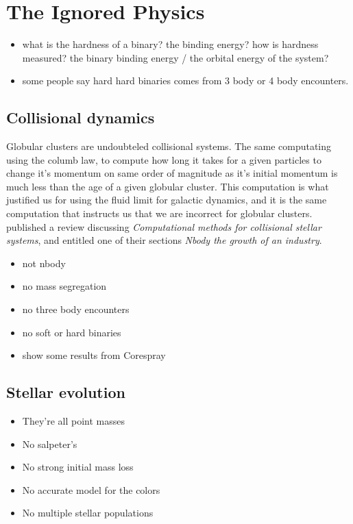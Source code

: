 \section{The Ignored Physics}



    \begin{itemize}
        \item what is the hardness of a binary? the binding energy? how is hardness measured? the binary binding energy / the orbital energy of the system? 
        \item some people say hard hard binaries comes from 3 body or 4 body encounters. 
    \end{itemize}


    \subsection{Collisional dynamics}

        Globular clusters are undoubteled collisional systems. The same computating using the columb law, to compute how long it takes for a given particles to change it's momentum on same order of magnitude as it's initial momentum is much less than the age of a given globular cluster. This computation is what justified us for using the fluid limit for galactic dynamics, and it is the same computation that instructs us that we are incorrect for globular clusters. \citet{2023LRCA....9....3S} published a review discussing \textit{Computational methods for collisional stellar systems}, and entitled one of their sections \textit{Nbody the growth of an industry}. 


        \begin{itemize}
            \item not nbody
            \item no mass segregation
            \item no three body encounters 
            \item no soft or hard binaries 
            \item show some results from Corespray 
        \end{itemize}
    
    \subsection{Stellar evolution}
        \begin{itemize}
            \item They're all point masses 
            \item No salpeter's 
            \item No strong initial mass loss 
            \item No accurate model for the colors 
            \item No multiple stellar populations 
        \end{itemize}
    
